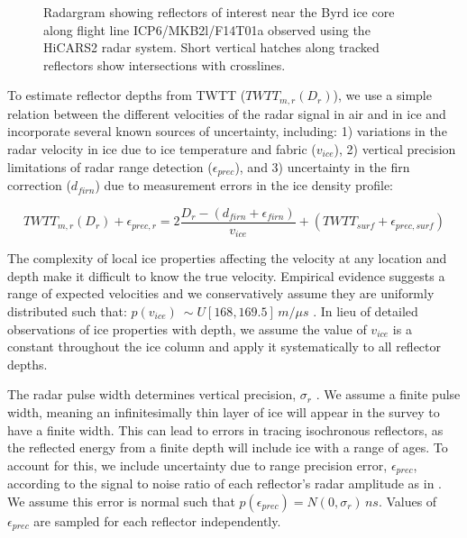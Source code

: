 \begin{figure}[h]
\centering
{}
\caption{Radargram showing reflectors of interest near the Byrd ice core along flight line ICP6/MKB2l/F14T01a observed using the HiCARS2 radar system. Short vertical hatches along tracked reflectors show intersections with crosslines.}
\label{fig:layergram}
\end{figure}


To estimate reflector depths from TWTT ($TWTT_{m,r}(D_r)$), we use a simple relation between the different velocities of the radar signal in air and in ice and incorporate several known sources of uncertainty, including: 1) variations in the radar velocity in ice due to ice temperature and fabric ($v_{ice}$), 2) vertical precision limitations of radar range detection ($\epsilon_{prec}$), and 3) uncertainty in the firn correction ($d_{firn}$) due to measurement errors in the ice density profile:

\begin{equation}\label{deptheqn}
TWTT_{m,r}(D_r) + \epsilon_{prec,r} = 2 \frac{D_r - (d_{firn}+\epsilon_{firn})}{v_{ice}} + (TWTT_{surf} + \epsilon_{prec,surf})
\end{equation}

The complexity of local ice properties affecting the velocity at any location and depth make it difficult to know the true velocity. Empirical evidence suggests a range of expected velocities and we conservatively assume they are uniformly distributed such that: $p(v_{ice}) ~\sim U[168,169.5]\,m/{\mu}s$ \citep{fujita2000}. In lieu of detailed observations of ice properties with depth, we assume the value of $v_{ice}$ is a constant throughout the ice column and apply it systematically to all reflector depths.

The radar pulse width determines vertical precision, $\sigma_r$ \citep{millar1982}. We assume a finite pulse width, meaning an infinitesimally thin layer of ice will appear in the survey to have a finite width. This can lead to errors in tracing isochronous reflectors, as the reflected energy from a finite depth will include ice with a range of ages. To account for this, we include uncertainty due to range precision error, $\epsilon_{prec}$, according to the signal to noise ratio of each reflector's radar amplitude as in \citet{cavitte2016}. We assume this error is normal such that $p(\epsilon_{prec}) = N(0,\sigma_r)\,ns$. Values of $\epsilon_{prec}$ are sampled for each reflector independently.


